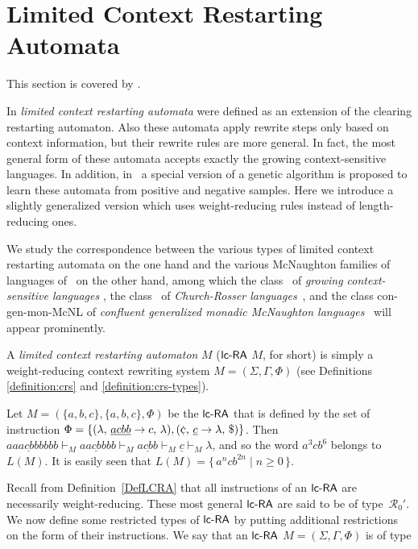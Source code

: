 \section{Limited Context Restarting Automata}\label{section:lcra}

This section is covered by \cite{OCM13}.

In \cite{B11} \emph{limited context restarting automata} were defined as an extension of the clearing restarting automaton. Also these automata apply rewrite steps only based on context information, but their rewrite rules are more general. In fact, the most general form of these automata accepts exactly the growing context-sensitive languages. In addition, in~\cite{B11} a special version of a genetic algorithm is proposed to learn these automata from positive and negative samples. Here we introduce a slightly generalized version which uses weight-reducing rules instead of length-reducing ones.

We study the correspondence between the various types of limited context restarting automata on the one hand and the various McNaughton families of languages of~\cite{Beaudry2003} on the other hand, among which the class \GCSL\ of \emph{growing context-sensitive languages} \cite{Buntrock19981,DW86}, the class \CRL\ of \emph{Church-Rosser languages}~\cite{MNO88}, and the class {\sf con-gen-mon-McNL} of \emph{confluent generalized monadic McNaughton languages}~\cite{Leupold2011} will appear prominently.

\begin{definition}\label{DefLCRA}
A {\em limited context restarting automaton} $M$ ($\lcRA$ $M$, for short) is simply a weight-reducing context rewriting system $M=(\Sigma,\Gamma,\Phi)$ (see Definitions \ref{definition:crs} and \ref{definition:crs-types}).
\end{definition}

\begin{example}
Let $M=(\{a,b,c\},\{a,b,c\},\Phi)$ be the $\lcRA$ that is defined by the set of instruction $\Phi=\{\rarule{\lambda}{\underline{acbb}}{c}{\lambda},\rarule{\cent}{\underline{c}}{\lambda}{\$}\}$. Then $aa\underline{acbb}bbbb \vdash_M a\underline{acbb}bb \vdash_M \underline{acbb} \vdash_M \underline{c} \vdash_M \lambda$, and so the word $a^3cb^6$ belongs to $L(M)$. It is easily seen that $L(M) = \{\, a^ncb^{2n} \mid n \ge 0 \,\}$.
\end{example}

Recall from Definition~\ref{DefLCRA} that all instructions of an $\lcRA$ are necessarily weight-reducing. These most general $\lcRA$ are said to be of type~$\mathcal{R}_0'$. We now define some restricted types of $\lcRA$ by putting additional restrictions on the form of their instructions. We say that an $\lcRA$ $M=(\Sigma,\Gamma,\Phi)$ is of type

